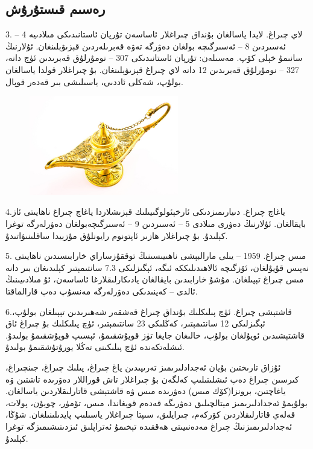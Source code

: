\documentclass[24]{article}
\begin{document}
\begin{Arabic}



\newfontfamily{}
\section{\textarabic{رەسىم قىستۇرۇش}}



3. لاي چىراغ. لايدا ياسالغان بۇنداق چىراغلار ئاساسەن تۇرپان ئاستانىدىكى مىلادىيە 4 – ئەسىردىن 8 – ئەسىرگىچە بولغان دەۋرگە تەۋە قەبرىلەردىن قېزىۋېلىنغان. ئۇلارنىڭ سانىمۇ خېلى كۆپ. مەسىلەن: تۇرپان ئاستانىدىكى 307 – نومۇرلۇق قەبرىدىن ئۈچ دانە، 327 – نومۇرلۇق قەبرىدىن 12 دانە لاي چىراغ قېزىۋېلىنغان. بۇ چىراغلار قولدا ياسالغان بولۇپ، شەكلى ئاددىي، ياسىلىشى بىر قەدەر قوپال.

\begin{figure}
  \begin{center}
    \includegraphics[width=0.58\textwidth]{lamp.jpg}
  \end{center}
\end{figure}
4.ياغاچ چىراغ. دىيارىمىزدىكى ئارخېئولوگىيىلىك قېزىشلاردا ياغاچ چىراغ ناھايىتى ئاز بايقالغان. ئۇلارنىڭ دەۋرى مىلادى 5 – ئەسىردىن 9 – ئەسىرگىچەبولغان دەۋرلەرگە توغرا كېلىدۇ. بۇ چىراغلار ھازىر ئاپتونوم رايونلۇق مۇزېيدا ساقلىنىۋاتىدۇ.

5. مىس چىراغ. 1959 – يىلى مارالبېشى ناھىيىسىنىڭ توققۇزساراي خارابىسىدىن ناھايىتى نەپىس قۇيۇلغان، ئۆزگىچە ئالاھىدىلىككە ئىگە، ئېگىزلىكى 7.3 سانتىمېتىر كېلىدىغان بىر دانە مىس چىراغ تېپىلغان. مۇشۇ خارابىدىن بايقالغان يادىكارلىقلارغا ئاساسەن، ئۇ مىلادىيىنىڭ ئالدى – كەينىدىكى دەۋرلەرگە مەنسۇپ دەپ قارالماقتا.

6.قاشتېشى چىراغ. ئۈچ پىلىكلىك بۇنداق چىراغ قەشقەر شەھىرىدىن تېپىلغان بولۇپ، ئېگىزلىكى 12 سانتىمېتىر، كەڭلىكى 23 سانتىمېتىر، ئۈچ پىلىكلىك بۇ چىراغ ئاق قاشتېشىدىن ئويۇلغان بولۇپ، خالىغان جايغا تۈز قويۇشقىمۇ، ئېسىپ قويۇشقىمۇ بولىدۇ. ئىشلەتكەندە ئۈچ پىلىكىنى تەڭلا يورۇتۇشقىمۇ بولىدۇ.

ئۇزاق تارىختىن بۇيان ئەجدادلىرىمىز تەرىپىدىن ياغ چىراغ، پىلىك چىراغ، جىنچىراغ، كىرسىن چىراغ دەپ ئىشلىتىلىپ كەلگەن بۇ چىراغلار تاش قوراللار دەۋرىدە تاشتىن ۋە ياغاچتىن، برونزا(كۆك مىس) دەۋرىدە مىس ۋە قاشتېشى قاتارلىقلاردىن ياسالغان. بولۇپمۇ ئەجدادلىرىمىز مېتالچىلىق دەۋرىگە قەدەم قويغاندا، مىس، تۆمۈر، چويۇن، پولات، قەلەي قاتارلىقلاردىن كۆركەم، چىرايلىق، سىپتا چىراغلار ياسىلىپ پايدىلىنىلغان. شۇڭا، ئەجدادلىرىمىزنىڭ چىراغ مەدەنىيىتى ھەققىدە تېخىمۇ ئەتراپلىق ئىزدىنىشىمىزگە توغرا كېلىدۇ.
\end{Arabic}
\end{document}
